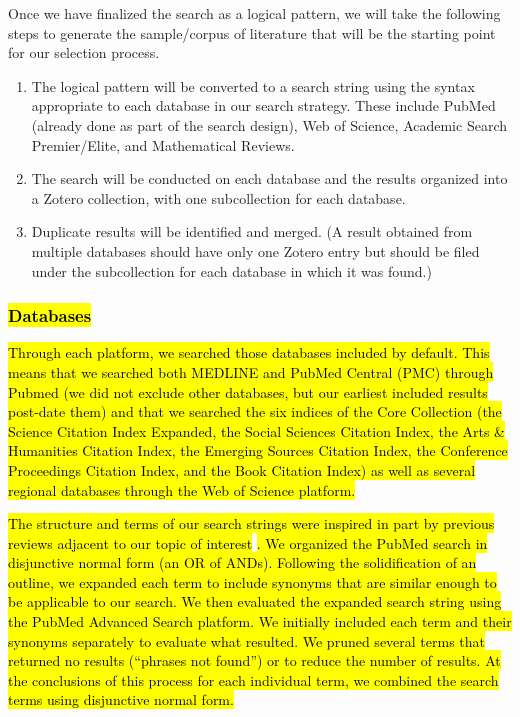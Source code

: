 \documentclass[sn-mathphys,Numbered,pdflatex]{sn-jnl}
\theoremstyle{remark}
\theoremstyle{definition}
\providecommand{\tightlist}{%
  \setlength{\itemsep}{0pt}\setlength{\parskip}{0pt}}
\begin{document}
Once we have finalized the search as a logical pattern, we will take the
following steps to generate the sample/corpus of literature that will be
the starting point for our selection process.

\begin{enumerate}
\def\labelenumi{\arabic{enumi}.}
\tightlist
\item
  The logical pattern will be converted to a search string using the
  syntax appropriate to each database in our search strategy. These
  include PubMed (already done as part of the search design), Web of
  Science, Academic Search Premier/Elite, and Mathematical Reviews.
\item
  The search will be conducted on each database and the results
  organized into a Zotero collection, with one subcollection for each
  database.
\item
  Duplicate results will be identified and merged. (A result obtained
  from multiple databases should have only one Zotero entry but should
  be filed under the subcollection for each database in which it was
  found.)
\end{enumerate}

\subsubsection{\texorpdfstring{\hl{Databases}}{}}\label{section-2}

\hl{Through each platform, we searched those databases included by default.
This means that we searched both MEDLINE and PubMed Central (PMC) through Pubmed (we did not exclude other databases, but our earliest included results post-date them) and that we searched the six indices of the Core Collection (the Science Citation Index Expanded, the Social Sciences Citation Index, the Arts \& Humanities Citation Index, the Emerging Sources Citation Index, the Conference Proceedings Citation Index, and the Book Citation Index) as well as several regional databases through the Web of Science platform.}

\hl{The structure and terms of our search strings were inspired in part by previous reviews adjacent to our topic of interest }\citep{Sharafoddini2017, Parimbelli2018}\hl{. We organized the PubMed search in disjunctive normal form (an OR of ANDs). Following the solidification of an outline, we expanded each term to include synonyms that are similar enough to be applicable to our search. We then evaluated the expanded search string using the PubMed Advanced Search platform. We initially included each term and their synonyms separately to evaluate what resulted. We pruned several terms that returned no results (``phrases not found'') or to reduce the number of results. At the conclusions of this process for each individual term, we combined the search terms using disjunctive normal form.}
\end{document}
